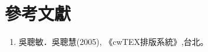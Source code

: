 \backmatter
\chapter{參考文獻}
\renewcommand{\labelenumi}{[\arabic{enumi}]}
\begin{enumerate}
    \item 吳聰敏．吳聰慧(2005), 《cwTEX排版系統》,台北。
\end{enumerate}
